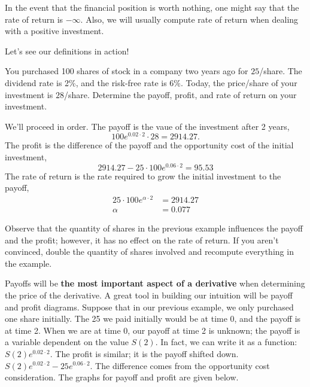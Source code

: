 \documentclass{ximera}
\begin{document}
\begin{remark}
In the event that the financial position is worth nothing, one might say that the rate of return is $-\infty$. Also, we will usually compute rate of return when dealing with a positive investment. 
\end{remark}

Let's see our definitions in action!

\begin{example}
You purchased 100 shares of stock in a company two years ago for $25$/share. The dividend rate is 2\%, and the risk-free rate is 6\%. Today, the price/share of your investment is $28$/share. Determine the payoff, profit, and rate of return on your investment.

\end{example}

\begin{solution}
We'll proceed in order. The payoff is the vaue of the investment after 2 years,
	\begin{equation*}
		100e^{0.02\cdot 2}\cdot 28=2914.27.
	\end{equation*}
The profit is the difference of the payoff and the opportunity cost of the initial investment,
	\begin{equation*}
		2914.27-25\cdot 100e^{0.06\cdot 2}=95.53
	\end{equation*}
The rate of return is the rate required to grow the initial investment to the payoff,
	\begin{align*}
		25\cdot 100e^{\alpha\cdot 2}&=2914.27\\
		\alpha&=0.077
	\end{align*}
\end{solution}


\begin{remark}
Observe that the quantity of shares in the previous example influences the payoff and the profit; however, it has no effect on the rate of return. If you aren't convinced, double the quantity of shares involved and recompute everything in the example.
\end{remark}

Payoffs will be {\bf the most important aspect of a derivative} when determining the price of the derivative. A great tool in building our intuition will be payoff and profit diagrams. Suppose that in our previous example, we only purchased one share initially. The 25 we paid initially would be at time 0, and the payoff is at time 2. When we are at time 0, our payoff at time 2 is unknown; the payoff is a variable dependent on the value $S(2)$. In fact, we can write it as a function: $S(2)e^{0.02\cdot 2}$. The profit is similar; it is the payoff shifted down. $S(2)e^{0.02\cdot 2}-25e^{0.06\cdot 2}$. The difference comes from the opportunity cost consideration. The graphs for payoff and profit are given below.
\end{document}
